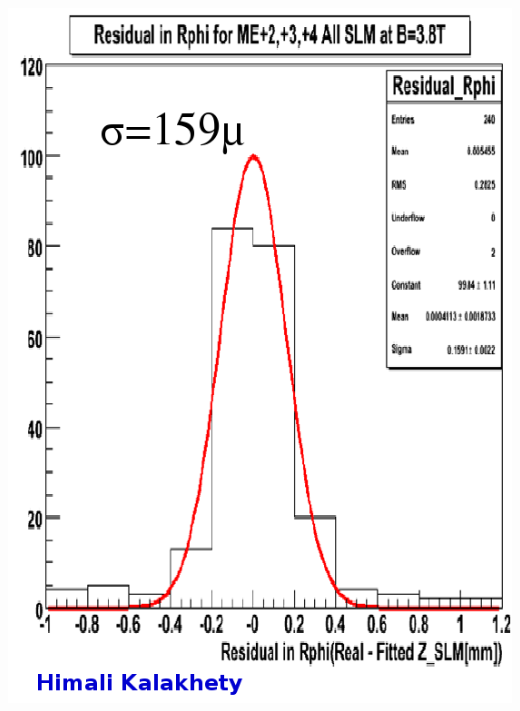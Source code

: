 \documentclass[compress]{beamer}
\begin{document}
\begin{frame}
\begin{columns}
\includegraphics[width=\linewidth]{hw_rphi_residuals.png}
\end{columns}
\end{frame}
\end{document}
